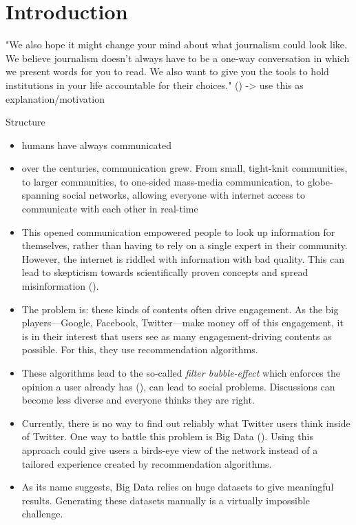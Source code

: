 \section{Introduction}
"We also hope it might change your mind about what journalism could look like. We believe journalism doesn’t always have to be a one-way conversation in which we present words for you to read. We also want to give you the tools to hold institutions in your life accountable for their choices." (\cite{angwinMakingPrivacyPersonal2020}) -> use this as explanation/motivation

Structure
\begin{itemize}
    \item humans have always communicated
    \item over the centuries, communication grew. From small, tight-knit communities, to larger communities, to one-sided mass-media communication, to globe-spanning social networks, allowing everyone with internet access to communicate with each other in real-time
    \item This opened communication empowered people to look up information for themselves, rather than having to rely on a single expert in their community. However, the internet is riddled with information with bad quality. This can lead to skepticism towards scientifically proven concepts and spread misinformation (\cite{krimskyRiskCommunicationInternet2007}). %
    \item The problem is: these kinds of contents often drive engagement. As the big players---Google, Facebook, Twitter---make money off of this engagement, it is in their interest that users see as many engagement-driving contents as possible. For this, they use recommendation algorithms.
    \item These algorithms lead to the so-called \emph{filter bubble-effect} which enforces the opinion a user already has (\cite{pariser2011filter}), can lead to social problems. Discussions can become less diverse and everyone thinks they are right.
    \item Currently, there is no way to find out reliably what Twitter users think inside of Twitter. One way to battle this problem is Big Data (\cite{crawfordCriticalQuestionsBig2012}). Using this approach could give users a birds-eye view of the network instead of a tailored experience created by recommendation algorithms.
    \item As its name suggests, Big Data relies on huge datasets to give meaningful results. Generating these datasets manually is a virtually impossible challenge.

\end{itemize}
